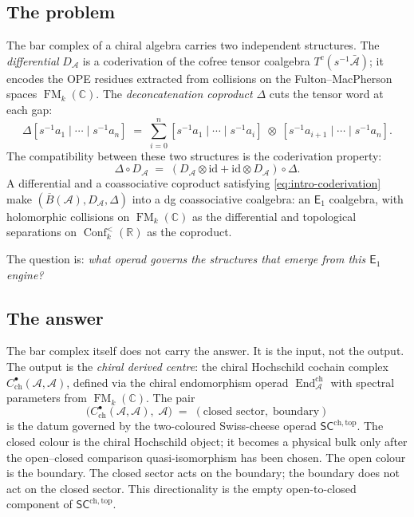 \documentclass[11pt,reqno]{amsart}
\theoremstyle{definition}
\theoremstyle{remark}
\newcommand{\cA}{\mathcal{A}}
\newcommand{\CC}{\mathbb{C}}
\newcommand{\RR}{\mathbb{R}}
\newcommand{\id}{\mathrm{id}}
\newcommand{\barB}{\overline{B}}
\newcommand{\barA}{\bar{\cA}}
\newcommand{\Eone}{\mathsf{E}_{1}}
\newcommand{\SCchtop}{\mathsf{SC}^{\mathrm{ch,top}}}
\DeclareMathOperator{\End}{End}
\DeclareMathOperator{\Conf}{Conf}
\DeclareMathOperator{\FM}{FM}
\numberwithin{equation}{section}
\begin{document}
\subsection{The problem}

The bar complex of a chiral algebra carries two independent
structures.  The \emph{differential} $D_\cA$ is a coderivation
of the cofree tensor coalgebra $T^c(s^{-1}\barA)$; it encodes
the OPE residues extracted from collisions on the
Fulton--MacPherson spaces $\FM_k(\CC)$.  The
\emph{deconcatenation coproduct} $\Delta$ cuts the tensor word
at each gap:
\begin{equation}\label{eq:intro-deconc}
  \Delta[s^{-1}a_1 \mid \cdots \mid s^{-1}a_n]
  \;=\;
  \sum_{i=0}^{n}
  [s^{-1}a_1 \mid \cdots \mid s^{-1}a_i]
  \;\otimes\;
  [s^{-1}a_{i+1} \mid \cdots \mid s^{-1}a_n].
\end{equation}
The compatibility between these two structures is the
coderivation property:
\begin{equation}\label{eq:intro-coderivation}
  \Delta \circ D_\cA
  \;=\;
  (D_\cA \otimes \id + \id \otimes D_\cA)
  \circ \Delta.
\end{equation}
A differential and a coassociative coproduct satisfying
\eqref{eq:intro-coderivation} make $(\barB(\cA), D_\cA, \Delta)$
into a dg coassociative coalgebra: an $\Eone$ coalgebra, with
holomorphic collisions on $\FM_k(\CC)$ as the differential and
topological separations on $\Conf_k^{<}(\RR)$ as the coproduct.

The question is: \emph{what operad governs the structures
that emerge from this $\Eone$ engine?}

\subsection{The answer}

The bar complex itself does not carry the answer.  It is the
input, not the output.  The output is the \emph{chiral derived
centre}: the chiral Hochschild cochain complex
$C^\bullet_{\mathrm{ch}}(\cA,\cA)$, defined via the chiral
endomorphism operad $\End^{\mathrm{ch}}_\cA$ with spectral
parameters from $\FM_k(\CC)$.  The pair
\begin{equation}\label{eq:intro-SC-pair}
  \bigl(C^\bullet_{\mathrm{ch}}(\cA,\cA),\; \cA\bigr)
  \;=\;
  (\text{closed sector},\; \text{boundary})
\end{equation}
is the datum governed by the two-coloured Swiss-cheese operad
$\SCchtop$.  The closed colour is the chiral Hochschild object;
it becomes a physical bulk only after the open--closed comparison
quasi-isomorphism has been chosen.  The open colour is the boundary.
The closed sector acts on the boundary; the boundary does not act on
the closed sector.  This directionality is the empty open-to-closed
component of $\SCchtop$.
\end{document}
